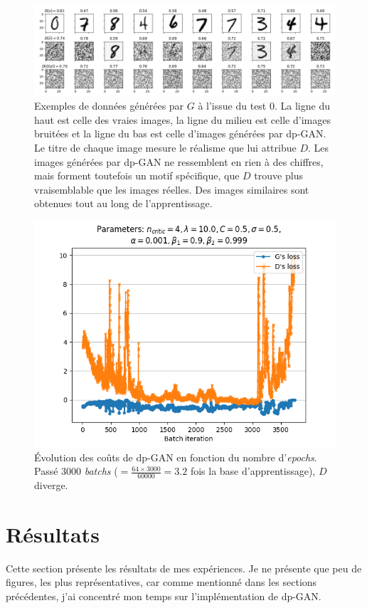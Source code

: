 \documentclass[a4paper,11pt,twoside]{article}
\theoremstyle{definition}
\begin{document}
\begin{figure}
    \includegraphics[width=\linewidth]{test0im.png}
    \caption{Exemples de données générées par $G$ à l'issue du test 0. La ligne du haut est celle des vraies images, la ligne du milieu est celle d'images bruitées et la ligne du bas est celle d'images générées par dp-GAN. Le titre de chaque image mesure le réalisme que lui attribue $D$. Les images générées par dp-GAN ne ressemblent en rien à des chiffres, mais forment toutefois un motif spécifique, que $D$ trouve plus vraisemblable que les images réelles. Des images similaires sont obtenues tout au long de l'apprentissage.}
    \label{fig:im_bad_dpgan_nop}
\end{figure}

\begin{figure}
    \includegraphics[width=0.6\linewidth]{test0loss.png}
    \caption{Évolution des coûts de dp-GAN en fonction du nombre d'\textit{epochs}. Passé 3000 \textit{batchs} ($= \frac{64 \times 3000}{60000} = 3.2$ fois la base d'apprentissage), $D$ diverge.}
    \label{fig:loss_bad_dpgan_nop}
\end{figure}

\section{Résultats}
\label{res}

Cette section présente les résultats de mes expériences. Je ne présente que peu de figures, les plus représentatives, car comme mentionné dans les sections précédentes, j'ai concentré mon temps sur l'implémentation de dp-GAN.
\end{document}
